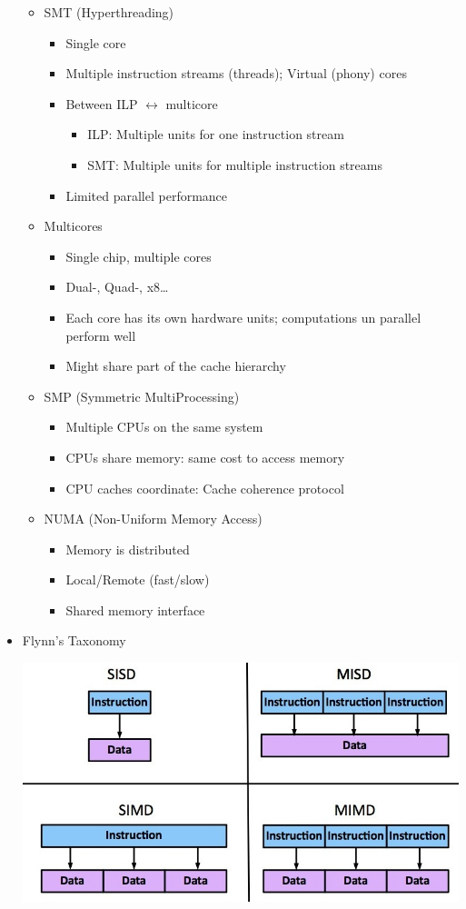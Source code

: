 \documentclass[a4paper]{article}
\begin{document}
\begin{itemize}
\begin{itemize}
\item SMT (Hyperthreading)
\begin{itemize}
\item Single core
\item Multiple instruction streams (threads); Virtual (phony) cores
\item Between ILP $\leftrightarrow$ multicore
\begin{itemize}
\item ILP: Multiple units for one instruction stream
\item SMT: Multiple units for multiple instruction streams
\end{itemize}
\item Limited parallel performance
\end{itemize}
\item Multicores
\begin{itemize}
\item Single chip, multiple cores
\item Dual-, Quad-, x8\dots
\item Each core has its own hardware units; computations un parallel perform well
\item Might share part of the cache hierarchy
\end{itemize}
\item SMP (Symmetric MultiProcessing)
\begin{itemize}
\item Multiple CPUs on the same system
\item CPUs share memory: same cost to access memory
\item CPU caches coordinate: Cache coherence protocol
\end{itemize}
\item NUMA (Non-Uniform Memory Access)
\begin{itemize}
\item Memory is distributed
\item Local/Remote (fast/slow)
\item Shared memory interface
\end{itemize}
\end{itemize}
\item Flynn's Taxonomy 

\begin{center}
\includegraphics[scale=0.4]{Figures/flynnsTaxionomy.jpg}
\end{center}


\end{itemize}
\end{document}
